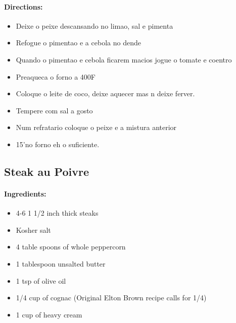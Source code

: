 \documentclass{article}
\begin{document}
\paragraph{Directions:}
\begin{itemize}
	\item Deixe o peixe descansando no limao, sal e pimenta
	\item Refogue o pimentao e a cebola no dende
	\item Quando o pimentao e cebola ficarem macios jogue o tomate e coentro
	\item Preaqueca o forno a 400F
	\item Coloque o leite de coco, deixe aquecer mas n deixe ferver. 
	\item Tempere com sal a gosto
	\item Num refratario coloque o peixe e a mistura anterior
	\item 15'no forno eh o suficiente.
\end{itemize} 

\subsection{Steak au Poivre}

\paragraph{Ingredients:}

\begin{itemize}
	\item 4-6 1 1/2 inch thick steaks
	\item Kosher salt
	\item 4 table spoons of whole peppercorn
	\item 1 tablespoon unsalted butter
	\item 1 tsp of olive oil
	\item 1/4 cup of cognac (Original Elton Brown recipe calls for 1/4)
	\item 1 cup of heavy cream
\end{itemize}
\end{document}
